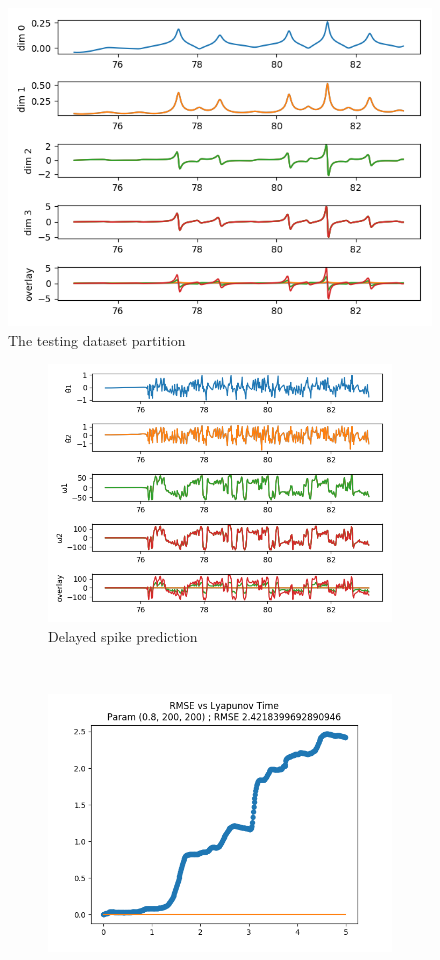 \documentclass{article}
\begin{document}
\begin{figure}[H]
    \centering
    \includegraphics[width=.5\linewidth]{doc/paper/images/doub_pend/test_data.png}
    \caption{The testing dataset partition}
    \label{fig:doub_pend_testing}
\end{figure}

\begin{figure}[H]
    \centering
    \begin{subfigure}[b]{0.45\textwidth}
        \includegraphics[width=\textwidth]{doc/paper/images/doub_pend/rank_0_param_77_fit.png}
        \caption{Delayed spike prediction}
    \end{subfigure}
    ~
    \begin{subfigure}[b]{0.45\textwidth}
        \includegraphics[width=\textwidth]{doc/paper/images/lorenz/rank_0_param_225_rmse.png}

\end{subfigure}
\end{figure}
\end{document}
